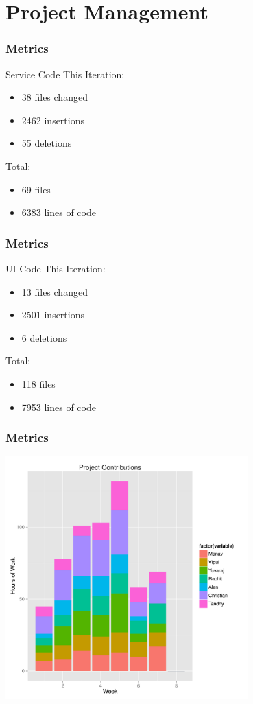 \documentclass[final]{beamer}
\begin{document}
\section{Project Management}

\begin{frame}
	\frametitle{Metrics}
	\begin{beamerboxesrounded}[shadow]{Service Code}
		This Iteration:
		\begin{itemize}
			\item{38 files changed}
			\item{2462 insertions}
			\item{55 deletions}
		\end{itemize}

		Total:
		\begin{itemize}
			\item{69 files}
			\item{6383 lines of code}
		\end{itemize}
	\end{beamerboxesrounded}
\end{frame}

\begin{frame}
	\frametitle{Metrics}
	\begin{beamerboxesrounded}[shadow]{UI Code}
		This Iteration:
		\begin{itemize}
			\item{13 files changed}
			\item{2501 insertions}
			\item{6 deletions}
		\end{itemize}

		Total:
		\begin{itemize}
			\item{118 files}
			\item{7953 lines of code}
		\end{itemize}
	\end{beamerboxesrounded}
\end{frame}

\begin{frame}
	\frametitle{Metrics}
	\includegraphics[width = 0.7\textwidth]{./hours_worked}
\end{frame}
\end{document}
